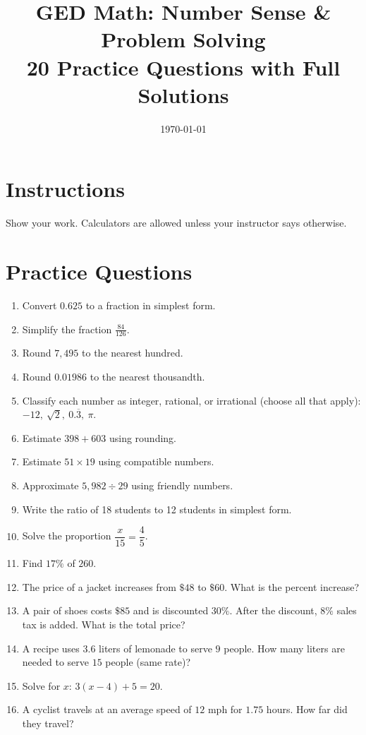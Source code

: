 \documentclass[11pt]{article}
\title{GED Math: Number Sense \& Problem Solving\\\large 20 Practice Questions with Full Solutions}
\author{}
\date{\today}
\begin{document}
\maketitle

\section*{Instructions}
Show your work. Calculators are allowed unless your instructor says otherwise.

\section*{Practice Questions}
\begin{enumerate}
  \item Convert \(0.625\) to a fraction in simplest form.
  \item Simplify the fraction \(\frac{84}{126}\).
  \item Round \(7{,}495\) to the nearest hundred.
  \item Round \(0.01986\) to the nearest thousandth.
  \item Classify each number as integer, rational, or irrational (choose all that apply): \(-12,\ \sqrt{2},\ 0.\overline{3},\ \pi\).
  \item Estimate \(398 + 603\) using rounding.
  \item Estimate \(51\times 19\) using compatible numbers.
  \item Approximate \(5{,}982 \div 29\) using friendly numbers.
  \item Write the ratio of 18 students to 12 students in simplest form.
  \item Solve the proportion \(\dfrac{x}{15} = \dfrac{4}{5}\).
  \item Find \(17\%\) of \(260\).
  \item The price of a jacket increases from \(\$48\) to \(\$60\). What is the percent increase?
  \item A pair of shoes costs \(\$85\) and is discounted \(30\%\). After the discount, \(8\%\) sales tax is added. What is the total price?
  \item A recipe uses \(3.6\) liters of lemonade to serve \(9\) people. How many liters are needed to serve \(15\) people (same rate)?
  \item Solve for \(x\): \(3(x-4)+5=20\).
  \item A cyclist travels at an average speed of \(12\) mph for \(1.75\) hours. How far did they travel?

\end{enumerate}
\end{document}

